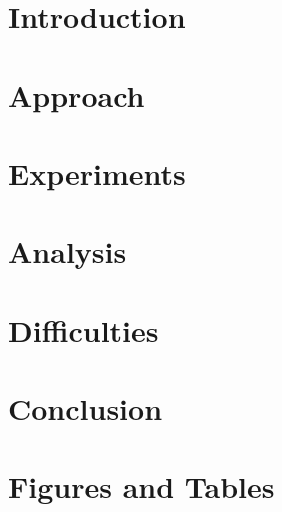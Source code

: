 \documentclass[journal]{IEEEtran}
\begin{document}
\IEEEpeerreviewmaketitle

\section{Introduction}
\label{sec:intro}


\section{Approach}
\label{sec:approach}


\section{Experiments}
\label{sec:exp}


\section{Analysis}
\label{sec:analysis}


\section{Difficulties}
\label{sec:difficulties}


\section{Conclusion}
\label{sec:conclusions}


\clearpage
\newpage
\onecolumn
\appendices
\section{Figures and Tables}


\end{document}
